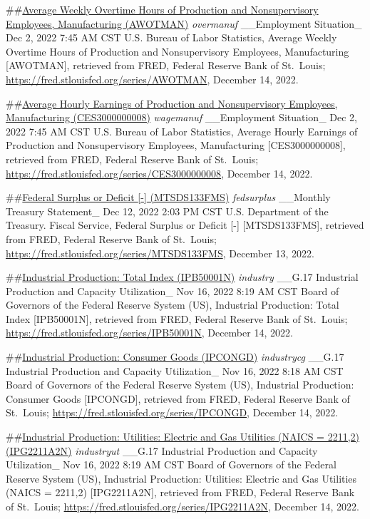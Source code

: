 \documentclass[
]{article}
\begin{document}
\#\#\href{https://fred.stlouisfed.org/series/AWOTMAN}{Average Weekly
Overtime Hours of Production and Nonsupervisory Employees, Manufacturing
(AWOTMAN)} \emph{overmanuf} \_\_Employment Situation\_ Dec 2, 2022 7:45
AM CST U.S. Bureau of Labor Statistics, Average Weekly Overtime Hours of
Production and Nonsupervisory Employees, Manufacturing {[}AWOTMAN{]},
retrieved from FRED, Federal Reserve Bank of St.~Louis;
\url{https://fred.stlouisfed.org/series/AWOTMAN}, December 14, 2022.

\#\#\href{https://fred.stlouisfed.org/series/CES3000000008}{Average
Hourly Earnings of Production and Nonsupervisory Employees,
Manufacturing (CES3000000008)} \emph{wagemanuf} \_\_Employment
Situation\_ Dec 2, 2022 7:45 AM CST U.S. Bureau of Labor Statistics,
Average Hourly Earnings of Production and Nonsupervisory Employees,
Manufacturing {[}CES3000000008{]}, retrieved from FRED, Federal Reserve
Bank of St.~Louis;
\url{https://fred.stlouisfed.org/series/CES3000000008}, December 14,
2022.

\#\#\href{https://fred.stlouisfed.org/series/MTSDS133FMS}{Federal
Surplus or Deficit {[}-{]} (MTSDS133FMS)} \emph{fedsurplus} \_\_Monthly
Treasury Statement\_ Dec 12, 2022 2:03 PM CST U.S. Department of the
Treasury. Fiscal Service, Federal Surplus or Deficit {[}-{]}
{[}MTSDS133FMS{]}, retrieved from FRED, Federal Reserve Bank of
St.~Louis; \url{https://fred.stlouisfed.org/series/MTSDS133FMS},
December 13, 2022.

\#\#\href{https://fred.stlouisfed.org/series/IPB50001N}{Industrial
Production: Total Index (IPB50001N)} \emph{industry} \_\_G.17 Industrial
Production and Capacity Utilization\_ Nov 16, 2022 8:19 AM CST Board of
Governors of the Federal Reserve System (US), Industrial Production:
Total Index {[}IPB50001N{]}, retrieved from FRED, Federal Reserve Bank
of St.~Louis; \url{https://fred.stlouisfed.org/series/IPB50001N},
December 14, 2022.

\#\#\href{https://fred.stlouisfed.org/series/IPCONGD}{Industrial
Production: Consumer Goods (IPCONGD)} \emph{industrycg} \_\_G.17
Industrial Production and Capacity Utilization\_ Nov 16, 2022 8:18 AM
CST Board of Governors of the Federal Reserve System (US), Industrial
Production: Consumer Goods {[}IPCONGD{]}, retrieved from FRED, Federal
Reserve Bank of St.~Louis;
\url{https://fred.stlouisfed.org/series/IPCONGD}, December 14, 2022.

\#\#\href{https://fred.stlouisfed.org/series/IPG2211A2N}{Industrial
Production: Utilities: Electric and Gas Utilities (NAICS = 2211,2)
(IPG2211A2N)} \emph{industryut} \_\_G.17 Industrial Production and
Capacity Utilization\_ Nov 16, 2022 8:19 AM CST Board of Governors of
the Federal Reserve System (US), Industrial Production: Utilities:
Electric and Gas Utilities (NAICS = 2211,2) {[}IPG2211A2N{]}, retrieved
from FRED, Federal Reserve Bank of St.~Louis;
\url{https://fred.stlouisfed.org/series/IPG2211A2N}, December 14, 2022.
\end{document}
